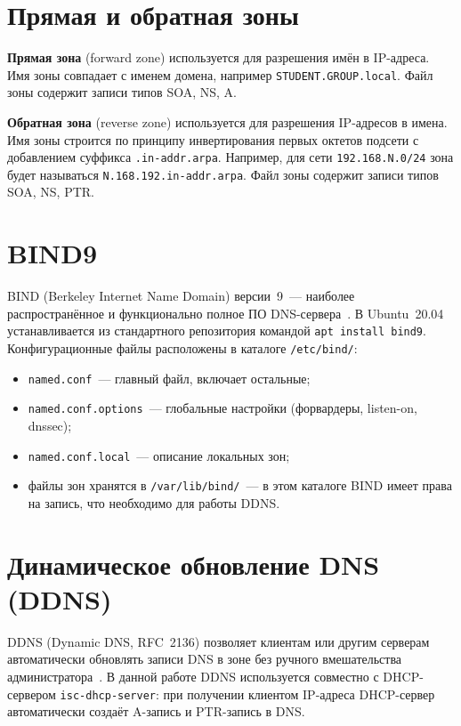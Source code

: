 \documentclass[a4paper,14pt,oneside,openany]{memoir}
\begin{document}
\section{Прямая и обратная зоны}

\textbf{Прямая зона} (forward zone) используется для разрешения имён в IP-адреса. Имя зоны совпадает с именем домена, например \texttt{STUDENT.GROUP.local}. Файл зоны содержит записи типов SOA, NS, A.

\textbf{Обратная зона} (reverse zone) используется для разрешения IP-адресов в имена. Имя зоны строится по принципу инвертирования первых октетов подсети с добавлением суффикса \texttt{.in-addr.arpa}. Например, для сети \texttt{192.168.N.0/24} зона будет называться \texttt{N.168.192.in-addr.arpa}. Файл зоны содержит записи типов SOA, NS, PTR.

\section{BIND9}

BIND (Berkeley Internet Name Domain) версии~9~--- наиболее распространённое и функционально полное ПО DNS-сервера~\cite{bind9_admin}. В Ubuntu~20.04 устанавливается из стандартного репозитория командой \texttt{apt install bind9}. Конфигурационные файлы расположены в каталоге \texttt{/etc/bind/}:
\begin{itemize}
    \item \texttt{named.conf}~--- главный файл, включает остальные;
    \item \texttt{named.conf.options}~--- глобальные настройки (форвардеры, listen-on, dnssec);
    \item \texttt{named.conf.local}~--- описание локальных зон;
    \item файлы зон хранятся в \texttt{/var/lib/bind/}~--- в этом каталоге BIND имеет права на запись, что необходимо для работы DDNS.
\end{itemize}

\section{Динамическое обновление DNS (DDNS)}

DDNS (Dynamic DNS, RFC~2136) позволяет клиентам или другим серверам автоматически обновлять записи DNS в зоне без ручного вмешательства администратора~\cite{rfc2136}. В данной работе DDNS используется совместно с DHCP-сервером \texttt{isc-dhcp-server}: при получении клиентом IP-адреса DHCP-сервер автоматически создаёт A-запись и PTR-запись в DNS.
\end{document}
